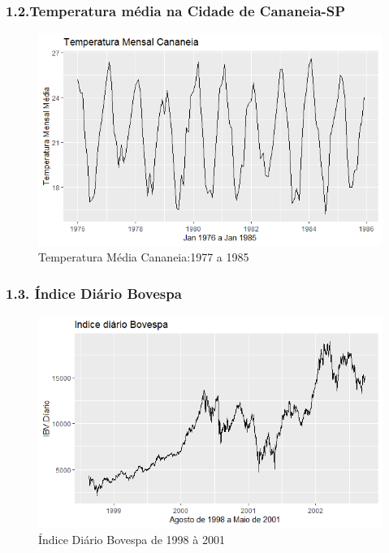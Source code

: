 \documentclass{beamer}
\begin{document}
	\begin{frame}
		\frametitle{1.2.Temperatura média na Cidade de Cananeia-SP}
		\begin{figure}[!ht]
			\centering
			\caption[Temperatura Média Cananeia:1977 a 1985]{Temperatura Média Cananeia:1977 a 1985}
			\label{fig:tempcananeia}
			\includegraphics[width=0.7\linewidth]{apresentacao_series_temporais/images/temp_cananeia}
		\end{figure}
	\end{frame}
	
	\begin{frame}
		\frametitle{1.3. Índice Diário Bovespa}
		\begin{figure}[!ht]
				\centering
				\caption[Índice Diário Bovespa de 1998 à 2001]{Índice Diário Bovespa de 1998 à 2001}
				\label{fig:ibovespa}
				\includegraphics[width=0.7\linewidth]{apresentacao_series_temporais/images/IBOVESPA.D}
		\end{figure}
	\end{frame}
\end{document}
